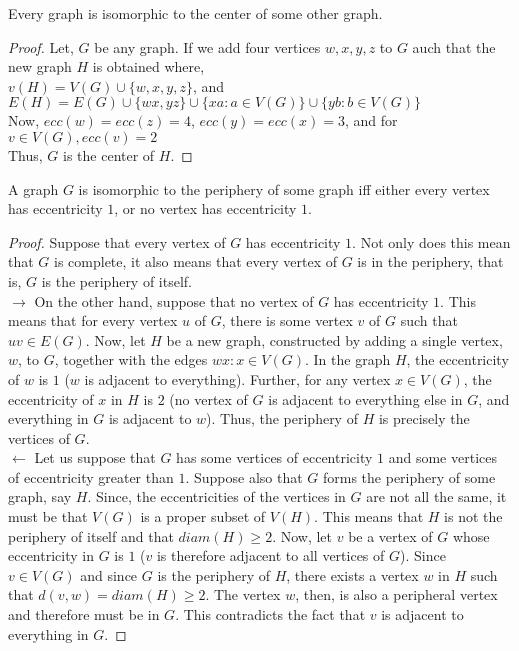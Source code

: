 \documentclass[../basic_graph_theory.tex]{subfiles}
\begin{document}
\begin{thm}
    Every graph is isomorphic to the center of some other graph.
\end{thm}
\begin{proof}
    Let, $G$ be any graph. If we add four vertices $w,x,y,z$ to $G$ auch that the new graph $H$ is obtained where,\\
    $v(H)=V(G) \cup \{w,x,y,z\}$, and\\
    $E(H)=E(G) \cup \{wx,yz\} \cup \{xa:a \in V(G)\} \cup \{yb:b \in V(G)\}$\\
    Now, $ecc(w)=ecc(z)=4$, $ecc(y)=ecc(x)=3$, and for $v \in V(G), ecc(v)=2$\\
    Thus, $G$ is the center of $H$.
\end{proof}

\begin{thm}
    A graph $G$ is isomorphic to the periphery of some graph iff either every vertex has eccentricity $1$, or no vertex has eccentricity $1$.
\end{thm}
\begin{proof}
    Suppose that every vertex of $G$ has eccentricity $1$. Not only does this mean that $G$ is complete, it also means that every vertex of $G$ is in the periphery, that is, $G$ is the periphery of itself.\\
    $\rightarrow$ On the other hand, suppose that no vertex of $G$ has eccentricity $1$. This means that for every vertex $u$ of $G$, there is some vertex $v$ of $G$ such that $uv \in E(G)$. Now, let $H$ be a new graph, constructed by adding a single vertex, $w$, to $G$, together with the edges ${wx:x \in V (G)}$. In the graph $H$, the eccentricity of $w$ is $1$ ($w$ is adjacent to everything). Further, for any vertex $x \in V (G)$, the eccentricity of $x$ in $H$ is $2$ (no vertex of $G$ is adjacent to everything else in $G$, and everything in $G$ is adjacent to $w$). Thus, the periphery of $H$ is precisely the vertices of $G$.\\
    $\leftarrow$ Let us suppose that $G$ has some vertices of eccentricity $1$ and some vertices of eccentricity greater than $1$. Suppose also that $G$ forms the periphery of some graph, say $H$. Since, the eccentricities of the vertices in $G$ are not all the same, it must be that $V(G)$ is a proper subset of $V(H)$. This means that $H$ is not the periphery of itself and that $diam(H) \ge 2$. Now, let $v$ be a vertex of $G$ whose eccentricity in $G$ is $1$ ($v$ is therefore adjacent to all vertices of $G$). Since $v \in V(G)$ and since $G$ is the periphery of $H$, there exists a vertex $w$ in $H$ such that $d(v,w) = diam(H) \ge 2$. The vertex $w$, then, is also a peripheral vertex and therefore must be in $G$. This contradicts the fact that $v$ is adjacent to everything in $G$.
\end{proof}
\end{document}
